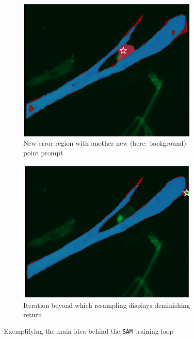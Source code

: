 \begin{figure}
	\medskip
	
	\begin{subfigure}{0.45\textwidth}
		\centering
		\includegraphics[width=\linewidth]{images/training3}
		\caption{New error region with another new (here: background) point prompt}
		\label{figtrain3}
	\end{subfigure}
	\hfill
	\begin{subfigure}{0.45\textwidth}
		\centering
		\includegraphics[width=\linewidth]{images/training4}
		\caption{Iteration beyond which resampling displays deminishing return}
		\label{figtrain4}
	\end{subfigure}
	\caption[\texttt{SAM} trainings loop]{Exemplifying the main idea behind the \texttt{SAM} training loop}
	\label{figtrain}
\end{figure}

